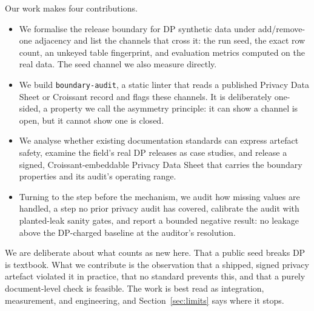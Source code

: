 \documentclass[conference]{IEEEtran}
\newcommand{\code}[1]{\texttt{\small #1}}
\begin{document}
Our work makes four contributions.
\begin{itemize}
\item We formalise the release boundary for DP synthetic data under add/remove-one adjacency and list
the channels that cross it: the run seed, the exact row count, an unkeyed table fingerprint, and
evaluation metrics computed on the real data. The seed channel we also measure directly.
\item We build \code{boundary-audit}, a static linter that reads a published Privacy Data Sheet or
Croissant record and flags these channels. It is deliberately one-sided, a property we call the
asymmetry principle: it can show a channel is open, but it cannot show one is closed.
\item We analyse whether existing documentation standards can express artefact safety, examine the
field's real DP releases as case studies, and release a signed, Croissant-embeddable Privacy Data
Sheet that carries the boundary properties and its audit's operating range.
\item Turning to the step before the mechanism, we audit how missing values are handled, a step no
prior privacy audit has covered, calibrate the audit with planted-leak sanity gates, and report a
bounded negative result: no leakage above the DP-charged baseline at the auditor's resolution.
\end{itemize}
We are deliberate about what counts as new here. That a public seed breaks DP is textbook. What we
contribute is the observation that a shipped, signed privacy artefact violated it in practice, that no
standard prevents this, and that a purely document-level check is feasible. The work is best read as
integration, measurement, and engineering, and Section~\ref{sec:limits} says where it stops.
\end{document}
